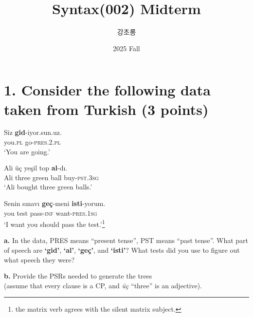 \documentclass{article}
\newcommand{\glabbr}[1]{\textsc{\MakeLowercase{#1}}}
\begin{document}
\large

\title{Syntax(002) Midterm}
\author{강초롱}
\date{2025 Fall}
\maketitle
\thispagestyle{fancy}
\bigskip

\section{1. Consider the following data taken from Turkish \normalsize(3 points)}
\medskip 
\begin{exe}
  \ex
  \gll Siz \textbf{gid}-iyor.sun.uz.\\
       you.\glabbr{PL} go-\glabbr{PRES}.2.\glabbr{PL}\\
  \glt `You are going.'

  \ex
  \gll Ali \"{u}\c{c} ye\c{s}il top \textbf{al}-d\i.\\
       Ali three green ball buy-\glabbr{PST}.3\glabbr{SG}\\
  \glt `Ali bought three green balls.'

  \ex
  \gll Senin s\i{}nav\i{} \textbf{ge\c{c}}-meni
       \textbf{isti}-yorum.\\
       you test pass-\glabbr{INF} want-\glabbr{PRES}.1\glabbr{SG}\\
  \glt `I want you should pass the test.'\footnote{the matrix verb agrees with the silent matrix subject.}
\end{exe}
\bigskip
\noindent \textbf{a.} In the data, PRES means ``present tense'', PST means ``past tense''. 
What part of speech are \textbf{`gid'}, \textbf{`al'}, \textbf{`ge\c{c}'}, and \textbf{`isti'}? 
What tests did you use to figure out what speech they were? \par
\vspace{2cm}

\noindent \textbf{b.} Provide the PSRs needed to generate the trees \\(assume that every clause is a CP, and \textit{\"{u}\c{c}} ``three'' is an adjective). \par
\vspace{3cm}

\newpage
\end{document}
